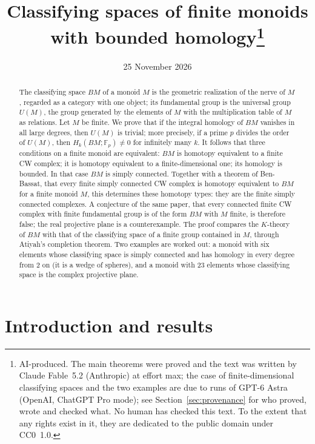 \documentclass[11pt,a4paper]{article}
\title{Classifying spaces of finite monoids with bounded homology\thanks{AI-produced.
The main theorems were proved and the text was written by Claude Fable~5.2
(Anthropic) at effort max; the case of finite-dimensional classifying spaces and
the two examples are due to runs of GPT-6 Astra (OpenAI, ChatGPT Pro mode); see
Section~\ref{sec:provenance} for who proved, wrote and checked what. No human
has checked this text. To the extent that any rights exist in it, they are
dedicated to the public domain under CC0~1.0.}}
\author{}
\date{25 November 2026}
\theoremstyle{definition}
\newcommand{\F}{\mathbb{F}}
\begin{document}
\maketitle

\begin{abstract}
The classifying space $BM$ of a monoid $M$ is the geometric realization of the
nerve of $M$, regarded as a category with one object; its fundamental group is
the universal group $U(M)$, the group generated by the elements of $M$ with
the multiplication table of $M$ as relations. Let $M$ be finite. We prove that
if the integral homology of $BM$ vanishes in all large degrees, then $U(M)$
is trivial; more precisely, if a prime $p$ divides the order of $U(M)$, then
$H_k(BM;\F_p)\neq 0$ for infinitely many $k$. It follows that three conditions
on a finite monoid are equivalent: $BM$ is homotopy equivalent to a finite CW
complex; it is homotopy equivalent to a finite-dimensional one; its homology
is bounded. In that case $BM$ is simply connected. Together with a theorem of
Ben-Bassat, that every finite simply connected CW complex is homotopy
equivalent to $BM$ for a finite monoid $M$, this determines these homotopy
types: they are the finite simply connected complexes. A conjecture of the same
paper, that every connected finite CW complex with finite fundamental group is
of the form $BM$ with $M$ finite, is therefore false; the real projective plane
is a counterexample. The proof compares the $K$-theory of $BM$ with that of the
classifying space of a finite group contained in $M$, through Atiyah's
completion theorem. Two examples are worked out: a monoid with six elements
whose classifying space is simply connected and has homology in every degree
from $2$ on (it is a wedge of spheres), and a monoid with $23$ elements whose
classifying space is the complex projective plane.
\end{abstract}

\section{Introduction and results}\label{sec:intro}
\end{document}
